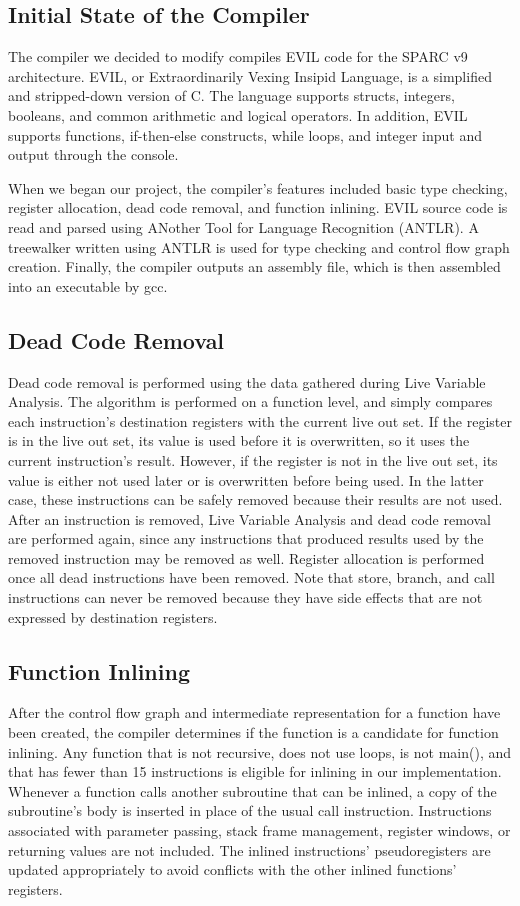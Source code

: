 \documentclass[12pt]{article}
\begin{document}
\begin{multicols}{2}
\section{Initial State of the Compiler}
The compiler we decided to modify compiles EVIL code for the SPARC v9 architecture.
EVIL, or Extraordinarily Vexing Insipid Language, is a simplified and stripped-down version of C.
The language supports structs, integers, booleans, and common arithmetic and logical operators.
In addition, EVIL supports functions, if-then-else constructs, while loops, and integer input and output through the console.

When we began our project, the compiler’s features included basic type checking, register allocation, dead code removal, and function inlining.
EVIL source code is read and parsed using ANother Tool for Language Recognition (ANTLR).
A treewalker written using ANTLR is used for type checking and control flow graph creation.
Finally, the compiler outputs an assembly file, which is then assembled into an executable by gcc.

\subsection{Dead Code Removal}
Dead code removal is performed using the data gathered during Live Variable Analysis.
The algorithm is performed on a function level, and simply compares each instruction’s destination registers with the current live out set.
If the register is in the live out set, its value is used before it is overwritten, so it uses the current instruction’s result.
However, if the register is not in the live out set, its value is either not used later or is overwritten before being used.
In the latter case, these instructions can be safely removed because their results are not used.
After an instruction is removed, Live Variable Analysis and dead code removal are performed again, since any instructions that produced results used by the removed instruction may be removed as well.
Register allocation is performed once all dead instructions have been removed.
Note that store, branch, and call instructions can never be removed because they have side effects that are not expressed by destination registers.

\subsection{Function Inlining}
After the control flow graph and intermediate representation for a function have been created, the compiler determines if the function is a candidate for function inlining.
Any function that is not recursive, does not use loops, is not main(), and that has fewer than 15 instructions is eligible for inlining in our implementation.
Whenever a function calls another subroutine that can be inlined, a copy of the subroutine’s body is inserted in place of the usual call instruction.
Instructions associated with parameter passing, stack frame management, register windows, or returning values are not included.
The inlined instructions’ pseudoregisters are updated appropriately to avoid conflicts with the other inlined functions’ registers.


\end{multicols}
\end{document}
